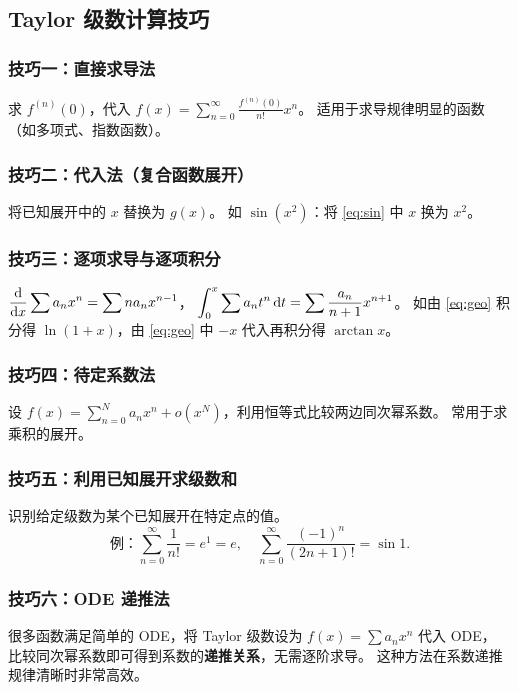 \documentclass{ctexart}
\begin{document}
\subsection{Taylor 级数计算技巧}

\subsubsection*{技巧一：直接求导法}
求 $f^{(n)}(0)$，代入 $f(x) = \sum_{n=0}^\infty \frac{f^{(n)}(0)}{n!} x^n$。
适用于求导规律明显的函数（如多项式、指数函数）。

\subsubsection*{技巧二：代入法（复合函数展开）}
将已知展开中的 $x$ 替换为 $g(x)$。
如 $\sin(x^2)$：将 \eqref{eq:sin} 中 $x$ 换为 $x^2$。

\subsubsection*{技巧三：逐项求导与逐项积分}
$\displaystyle \frac{\mathrm{d}}{\mathrm{d} x} \sum a_n x^n = \sum n a_n x^{n-1}$，
$\displaystyle \int_0^x \sum a_n t^n \,\mathrm{d} t = \sum \frac{a_n}{n+1} x^{n+1}$。
如由 \eqref{eq:geo} 积分得 $\ln(1+x)$，由 \eqref{eq:geo} 中 $-x$ 代入再积分得 $\arctan x$。

\subsubsection*{技巧四：待定系数法}
设 $f(x) = \sum_{n=0}^N a_n x^n + o(x^N)$，利用恒等式比较两边同次幂系数。
常用于求乘积的展开。

\subsubsection*{技巧五：利用已知展开求级数和}
识别给定级数为某个已知展开在特定点的值。
\[
  \text{例：} \sum_{n=0}^\infty \frac{1}{n!} = e^1 = e, \quad
  \sum_{n=0}^\infty \frac{(-1)^n}{(2n+1)!} = \sin 1.
\]

\subsubsection*{技巧六：ODE 递推法}
很多函数满足简单的 ODE，将 Taylor 级数设为 $f(x) = \sum a_n x^n$ 代入 ODE，
比较同次幂系数即可得到系数的\textbf{递推关系}，无需逐阶求导。
这种方法在系数递推规律清晰时非常高效。
\end{document}
